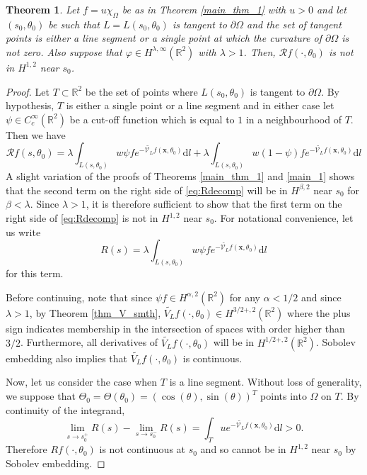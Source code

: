 \documentclass[a4paper,12pt]{amsart}
\numberwithin{equation}{section}
\theoremstyle{plain}
\newtheorem{theorem}{Theorem}
\numberwithin{theorem}{section}
\theoremstyle{definition}
\theoremstyle{remark}
\theoremstyle{remark}
\theoremstyle{remark}
\newcommand{\dd}{\mathrm{d}}  %
\newcommand{\vx}{{\mathbf{x}}}
\newcommand{\seanc}[1]{\begin{quotation}\textbf{Sean's comment:\
}{\textit{#1}}\end{quotation}}
\begin{document}
\begin{theorem}
\label{main_2}
Let $f = u\chi_\Omega$ be as in Theorem \ref{main_thm_1} with $u>0$ and let $(s_0,\theta_0)$ be such that $L = L(s_0,\theta_0)$ is tangent to $\partial \Omega$ and the set of tangent points is either a line segment or a single point at which the curvature of $\partial \Omega$ is not zero. Also suppose that $\varphi \in H^{\lambda,\infty}(\mathbb{R}^2)$ with $\lambda > 1$. Then, $\mathcal{R}f(\cdot,\theta_0)$ is not in $H^{1,2}$ near $s_0$.
\end{theorem}
\begin{proof}

Let $T \subset \mathbb{R}^2$ be the set of points where $L(s_0,\theta_0)$ is tangent to $\partial \Omega$. By hypothesis, $T$ is either a single point or a line segment and in either case let $\psi \in C_c^\infty(\mathbb{R}^2)$ be a cut-off function which is equal to $1$ in a neighbourhood of $T$. Then we have
\begin{equation}\label{eq:Rdecomp}
\mathcal{R}f(s,\theta_0) = \lambda \int_{L(s,\theta_0)}w \psi f e^{-\widetilde{\mathcal{V}_{L}}f(\vx,\theta_0)} \dd l + \lambda \int_{L(s,\theta_0)}w (1-\psi) f e^{-\widetilde{\mathcal{V}_{L}}f(\vx,\theta_0)} \dd l
\end{equation}
A slight variation of the proofs of Theorems \ref{main_thm_1} and \ref{main_1} shows that the second term on the right side of \eqref{eq:Rdecomp} will be in $H^{\beta,2}$ near $s_0$ for $\beta < \lambda$. Since $\lambda > 1$, it is therefore sufficient to show that the first term on the right side of \eqref{eq:Rdecomp} is not in $H^{1,2}$ near $s_0$. For notational convenience, let us write
\[
R(s) = \lambda \int_{L(s,\theta_0)}w \psi f e^{-\widetilde{\mathcal{V}_{L}}f(\vx,\theta_0)} \dd l
\]
for this term.

Before continuing, note that since $\psi f \in H^{\alpha,2}(\mathbb{R}^2)$ for any $\alpha< 1/2$ and since $\lambda > 1$, by Theorem \ref{thm_V_smth}, $\widetilde{V_L} f(\cdot,\theta_0) \in H^{3/2+,2}(\mathbb{R}^2)$ where the plus sign indicates membership in the intersection of spaces with order higher than $3/2$. Furthermore, all derivatives of $\widetilde{V_L} f(\cdot,\theta_0)$ will be in $H^{1/2+,2}(\mathbb{R}^2)$. Sobolev embedding also implies that $\widetilde{V_L} f(\cdot,\theta_0)$ is continuous.

Now, let us consider the case when $T$ is a line segment. Without loss of generality, we suppose that $\Theta_0 = \Theta(\theta_0) = (\cos(\theta),\sin(\theta))^T$ points into $\Omega$ on $T$. By continuity of the integrand,
\[
\lim_{s\rightarrow s_0^+} R(s) - \lim_{s\rightarrow s_0^-} R(s) = \int_T u e^{-\widetilde{\mathcal{V}_{L}}f(\vx,\theta_0)} \dd l > 0.
\]
Therefore $Rf(\cdot,\theta_0)$ is not continuous at $s_0$ and so cannot be in $H^{1,2}$ near $s_0$ by Sobolev embedding.


\end{proof}
\end{document}

